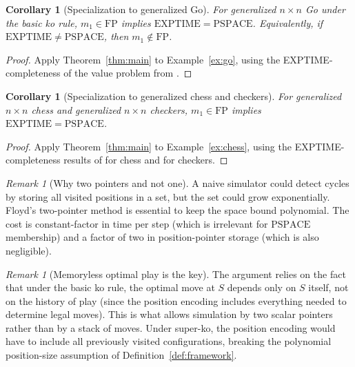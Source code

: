 \documentclass[11pt,a4paper]{amsart}
\theoremstyle{plain}
\newtheorem{corollary}[theorem]{Corollary}
\theoremstyle{definition}
\theoremstyle{remark}
\newtheorem{remark}[theorem]{Remark}
\newcommand{\FP}{\mathrm{FP}}
\newcommand{\EXPTIME}{\mathrm{EXPTIME}}
\newcommand{\PSPACE}{\mathrm{PSPACE}}
\begin{document}
\begin{corollary}[Specialization to generalized Go]
\label{cor:go}
For generalized $n \times n$ Go under the basic ko rule,
$m_1 \in \FP$ implies $\EXPTIME = \PSPACE$.
Equivalently, if $\EXPTIME \neq \PSPACE$, then $m_1 \notin \FP$.
\end{corollary}

\begin{proof}
Apply Theorem~\ref{thm:main} to Example~\ref{ex:go}, using the
EXPTIME-completeness of the value problem from \cite{Rob83}.
\end{proof}

\begin{corollary}[Specialization to generalized chess and checkers]
\label{cor:chess}
For generalized $n \times n$ chess and generalized $n \times n$
checkers, $m_1 \in \FP$ implies $\EXPTIME = \PSPACE$.
\end{corollary}

\begin{proof}
Apply Theorem~\ref{thm:main} to Example~\ref{ex:chess}, using the
EXPTIME-completeness results of \cite{FL81} for chess and \cite{Rob84}
for checkers.
\end{proof}

\begin{remark}[Why two pointers and not one]
\label{rem:two-pointers}
A naive simulator could detect cycles by storing all visited
positions in a set, but the set could grow exponentially. Floyd's
two-pointer method is essential to keep the space bound polynomial.
The cost is constant-factor in time per step (which is irrelevant
for $\PSPACE$ membership) and a factor of two in position-pointer
storage (which is also negligible).
\end{remark}

\begin{remark}[Memoryless optimal play is the key]
\label{rem:memoryless}
The argument relies on the fact that under the basic ko rule, the
optimal move at $S$ depends only on $S$ itself, not on the history of
play (since the position encoding includes everything needed to
determine legal moves). This is what allows simulation by two scalar
pointers rather than by a stack of moves. Under super-ko, the
position encoding would have to include all previously visited
configurations, breaking the polynomial position-size assumption of
Definition~\ref{def:framework}.
\end{remark}

\end{document}
